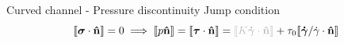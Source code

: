 \documentclass{beamer}  %
\newcommand{\gam}{\boldsymbol{\dot \gamma}}
\newcommand{\nn}{\mathbf{\hat n}}
\begin{document}
\begin{frame}{Curved channel - Pressure discontinuity}
    Jump condition 
    \begin{equation*}
        \llbracket\boldsymbol\sigma\cdot \nn \rrbracket = 0 \implies \llbracket p \nn \rrbracket = \llbracket\boldsymbol\tau\cdot \nn \rrbracket = {\color{gray!50} \llbracket K \gam \cdot \nn \rrbracket} + \tau_0 \llbracket \gam/\dot\gamma \cdot \nn \rrbracket
    \end{equation*}
    \begin{figure}
        \begin{overprint}
        \end{overprint}
    \end{figure}
\end{frame}
\end{document}
